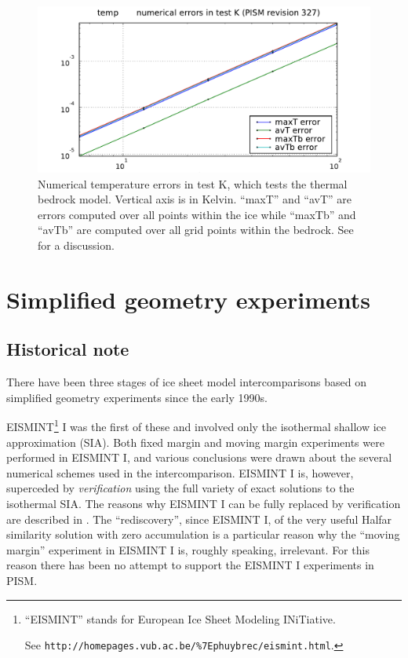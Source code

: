 \documentclass[11pt,final]{amsart}
\begin{document}
\begin{figure}[ht]
\includegraphics[width=4.8in,keepaspectratio=true]{figs/temperrs_K}
\caption{Numerical temperature errors in test K, which tests the thermal bedrock model.  Vertical axis is in Kelvin.  ``maxT'' and ``avT'' are errors computed over all points within the ice while ``maxTb'' and ``avTb'' are computed over all grid points within the bedrock.  See \cite{BuelerTestK} for a discussion.}
\label{fig:temperrsK}
\end{figure}


\clearpage\newpage
\section{Simplified geometry experiments}\label{sect:simp}

\subsection{Historical note}  There have been three stages of ice sheet model intercomparisons based on simplified geometry experiments since the early 1990s.

EISMINT\footnote{``EISMINT'' stands for European Ice Sheet Modeling INiTiative.  

See \texttt{http://homepages.vub.ac.be/\%7Ephuybrec/eismint.html}.} I \cite{EISMINT96} was the first of these and involved only the isothermal shallow ice approximation (SIA).  Both fixed margin and moving margin experiments were performed in EISMINT I, and various conclusions were drawn about the several numerical schemes used in the intercomparison.  EISMINT I is, however, superceded by \emph{verification} using the full variety of exact solutions to the isothermal SIA.  The reasons why EISMINT I can be fully replaced by verification are described in \cite{BLKCB}.  The ``rediscovery'', since EISMINT I, of the very useful Halfar similarity solution with zero accumulation \cite{Halfar83} is a particular reason why the ``moving margin'' experiment in EISMINT I is, roughly speaking, irrelevant.  For this reason there has been no attempt to support the EISMINT I experiments in PISM.
\end{document}
